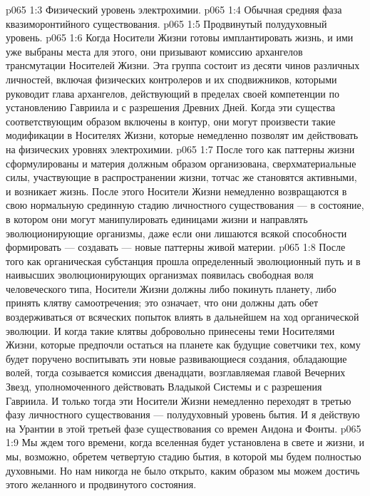 \vs p065 1:3 \bibnobreakspace Физический уровень электрохимии.
\vs p065 1:4 \bibnobreakspace Обычная средняя фаза квазиморонтийного существования.
\vs p065 1:5 \bibnobreakspace Продвинутый полудуховный уровень.
\vs p065 1:6 \pc Когда Носители Жизни готовы имплантировать жизнь, и ими уже выбраны места для этого, они призывают комиссию архангелов трансмутации Носителей Жизни. Эта группа состоит из десяти чинов различных личностей, включая физических контролеров и их сподвижников, которыми руководит глава архангелов, действующий в пределах своей компетенции по установлению Гавриила и с разрешения Древних Дней. Когда эти существа соответствующим образом включены в контур, они могут произвести такие модификации в Носителях Жизни, которые немедленно позволят им действовать на физических уровнях электрохимии.
\vs p065 1:7 После того как паттерны жизни сформулированы и материя должным образом организована, сверхматериальные силы, участвующие в распространении жизни, тотчас же становятся активными, и возникает жизнь. После этого Носители Жизни немедленно возвращаются в свою нормальную срединную стадию личностного существования --- в состояние, в котором они могут манипулировать единицами жизни и направлять эволюционирующие организмы, даже если они лишаются всякой способности формировать --- создавать --- новые паттерны живой материи.
\vs p065 1:8 После того как органическая субстанция прошла определенный эволюционный путь и в наивысших эволюционирующих организмах появилась свободная воля человеческого типа, Носители Жизни должны либо покинуть планету, либо принять клятву самоотречения; это означает, что они должны дать обет воздерживаться от всяческих попыток влиять в дальнейшем на ход органической эволюции. И когда такие клятвы добровольно принесены теми Носителями Жизни, которые предпочли остаться на планете как будущие советчики тех, кому будет поручено воспитывать эти новые развивающиеся создания, обладающие волей, тогда созывается комиссия двенадцати, возглавляемая главой Вечерних Звезд, уполномоченного действовать Владыкой Системы и с разрешения Гавриила. И только тогда эти Носители Жизни немедленно переходят в третью фазу личностного существования --- полудуховный уровень бытия. И я действую на Урантии в этой третьей фазе существования со времен Андона и Фонты.
\vs p065 1:9 Мы ждем того времени, когда вселенная будет установлена в свете и жизни, и мы, возможно, обретем четвертую стадию бытия, в которой мы будем полностью духовными. Но нам никогда не было открыто, каким образом мы можем достичь этого желанного и продвинутого состояния.
